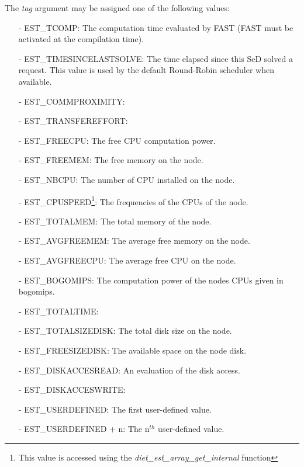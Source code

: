 \noindent The \textit{tag} argument may be assigned one of the following values:
\begin{itemize}
  \item[-] EST\_TCOMP: The computation time evaluated by FAST
    (FAST must be activated at the compilation time).
  \item[-] EST\_TIMESINCELASTSOLVE: The time elapsed since this SeD solved
    a request. This value is used by the default Round-Robin scheduler when
    available.
  \item[-] EST\_COMMPROXIMITY:
  \item[-] EST\_TRANSFEREFFORT:
  \item[-] EST\_FREECPU: The free CPU computation power.
  \item[-] EST\_FREEMEM: The free memory on the node.
  \item[-] EST\_NBCPU: The number of CPU installed on the node.
  \item[-] EST\_CPUSPEED\footnote{This value is accessed using the
      \textit{diet\_est\_array\_get\_internal} function}: The frequencies
    of the CPUs of the node.
  \item[-] EST\_TOTALMEM: The total memory of the node.
  \item[-] EST\_AVGFREEMEM: The average free memory on the node.
  \item[-] EST\_AVGFREECPU: The average free CPU on the node.
  \item[-] EST\_BOGOMIPS\footnotemark[\value{footnote}]: The computation power
    of the nodes CPUs given in bogomips.
  \item[-] EST\_TOTALTIME:
  \item[-] EST\_TOTALSIZEDISK: The total disk size on the node.
  \item[-] EST\_FREESIZEDISK: The available space on the node disk.
  \item[-] EST\_DISKACCESREAD: An evaluation of the disk access.
  \item[-] EST\_DISKACCESWRITE:
  \item[-] EST\_USERDEFINED: The first user-defined value.
  \item[-] EST\_USERDEFINED $+$ n: The n$^{th}$ user-defined value.
\end{itemize}

